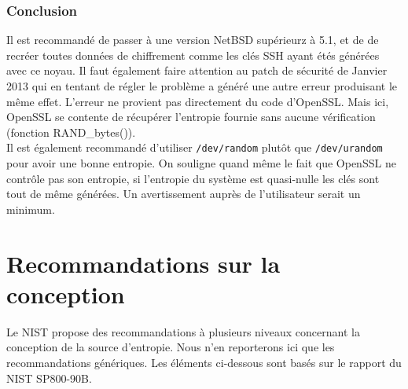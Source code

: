 		\subsubsection{Conclusion}
			
			Il est recommandé de passer à une version NetBSD supérieurz à 5.1, et de de recréer toutes données de chiffrement comme les clés SSH ayant étés générées avec ce noyau. Il faut également faire attention au patch de sécurité de Janvier 2013 qui en tentant de régler le problème a généré une autre erreur produisant le même effet.	L'erreur ne provient pas directement du code d'OpenSSL. Mais ici, OpenSSL se contente de récupérer l'entropie fournie sans aucune vérification (fonction RAND\_bytes()).\\ 

			Il est également recommandé d'utiliser \texttt{/dev/random} plutôt que \texttt{/dev/urandom} pour avoir une bonne entropie. On souligne quand même le fait que OpenSSL ne contrôle pas son entropie, si l'entropie du système est quasi-nulle les clés sont tout de même générées. Un avertissement auprès de l'utilisateur serait un minimum.
			
\section{Recommandations sur la conception}
Le NIST propose des recommandations à plusieurs niveaux concernant la conception de la source d'entropie. Nous n'en reporterons ici que les recommandations génériques. Les éléments ci-dessous sont basés sur le rapport du NIST SP800-90B.

